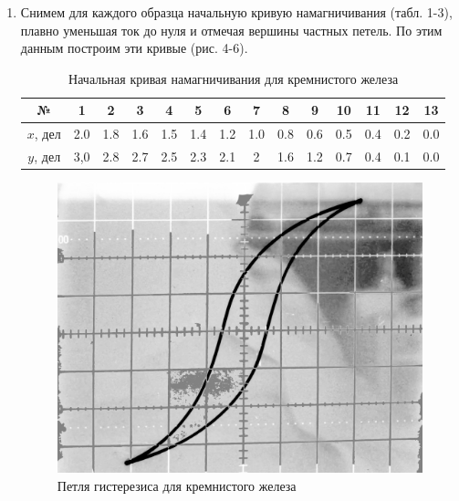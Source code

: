 \documentclass[12pt]{kiarticle}
\begin{document}
\begin{enumerate}
\begin{itemize}
  
  	
 	 \end{itemize}

  	
  	
  	\item Снимем для каждого образца начальную кривую намагничивания (табл. 1-3), плавно уменьшая ток до нуля и отмечая вершины частных петель. По этим данным построим эти кривые (рис. 4-6).
  	
  		\begin{table}[h!]
  		\caption{Начальная кривая намагничивания для кремнистого железа}
  		\begin{center}
  			\begin{tabular}{|c|c|c|c|c|c|c|c|c|c|c|c|c|c|} 
  				\hline 
  				№ &  1 &  2 & 3 & 4 & 5 &  6 &  7 & 8 & 9 & 10  &  11 &  12 & 13  \\ 	\hline
  				
  			 $ x $, дел & 2.0 & 1.8 & 1.6 & 1.5 & 1.4 & 1.2 & 1.0 & 0.8 & 0.6 & 0.5 & 0.4 & 0.2 & 0.0 \\
  				 $ y $, дел & 3,0 & 2.8 & 2.7 & 2.5 & 2.3 & 2.1 & 2 & 1.6 & 1.2 & 0.7 & 0.4 & 0.1 & 0.0 \\
  				\hline
  				
  			\end{tabular}
  		\end{center}
  	\end{table}
  	
  	\begin{figure}[h!]
  		\includegraphics[scale=0.22]{1.png}
  		\caption{Петля гистерезиса для кремнистого железа}
  	\end{figure}
  



\end{enumerate}
\end{document}
